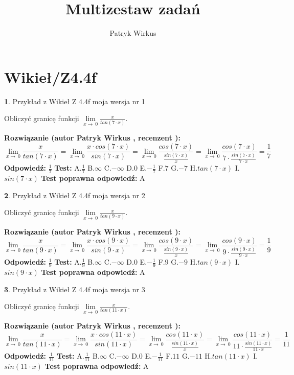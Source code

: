 \documentclass[12pt, a4paper]{article}
\title{Multizestaw zadań}
\author{Patryk Wirkus}
\date{}
\theoremstyle{definition} %
\newtheorem{zad}{}
\newcommand{\kategoria}[1]{\section{#1}}
\newcommand{\zadStart}[1]{\begin{zad}#1\newline}
\newcommand{\zadStop}{\end{zad}}
\newcommand{\rozwStart}[2]{\noindent \textbf{Rozwiązanie (autor #1 , recenzent #2): }\newline}
\newcommand{\rozwStop}{\newline}
\newcommand{\odpStart}{\noindent \textbf{Odpowiedź:}\newline}
\newcommand{\odpStop}{\newline}
\newcommand{\testStart}{\noindent \textbf{Test:}\newline}
\newcommand{\testStop}{\newline}
\newcommand{\kluczStart}{\noindent \textbf{Test poprawna odpowiedź:}\newline}
\newcommand{\kluczStop}{\newline}
\begin{document}
\maketitle

\kategoria{Wikieł/Z4.4f}


\zadStart{Przykład z Wikieł Z 4.4f moja wersja nr 1}


Obliczyć granicę funkcji $\lim\limits_{x\to\ 0}\frac{x}{tan(7 \cdot x)}$.
\zadStop
\rozwStart{Patryk Wirkus}{}
$$\lim\limits_{x\to\ 0}\frac{x}{tan(7 \cdot x)}=\lim\limits_{x\to\ 0}\frac{x \cdot cos(7 \cdot x)}{sin(7 \cdot x)}=\lim\limits_{x\to\ 0}\frac{cos(7 \cdot x)}{\frac{sin(7 \cdot x)}{x}}=\lim\limits_{x\to\ 0}\frac{cos(7 \cdot x)}{7 \cdot \frac{sin(7 \cdot x)}{7 \cdot x}} = \frac{1}{7}$$
\rozwStop
\odpStart
$\frac{1}{7}$
\odpStop
\testStart
A.$\frac{1}{7}$
B.$\infty$
C.$-\infty$
D.$0$
E.$-\frac{1}{7}$
F.$7$
G.$-7$
H.$tan(7 \cdot x)$
I.$sin(7 \cdot x)$
\testStop
\kluczStart
A
\kluczStop



\zadStart{Przykład z Wikieł Z 4.4f moja wersja nr 2}


Obliczyć granicę funkcji $\lim\limits_{x\to\ 0}\frac{x}{tan(9 \cdot x)}$.
\zadStop
\rozwStart{Patryk Wirkus}{}
$$\lim\limits_{x\to\ 0}\frac{x}{tan(9 \cdot x)}=\lim\limits_{x\to\ 0}\frac{x \cdot cos(9 \cdot x)}{sin(9 \cdot x)}=\lim\limits_{x\to\ 0}\frac{cos(9 \cdot x)}{\frac{sin(9 \cdot x)}{x}}=\lim\limits_{x\to\ 0}\frac{cos(9 \cdot x)}{9 \cdot \frac{sin(9 \cdot x)}{9 \cdot x}} = \frac{1}{9}$$
\rozwStop
\odpStart
$\frac{1}{9}$
\odpStop
\testStart
A.$\frac{1}{9}$
B.$\infty$
C.$-\infty$
D.$0$
E.$-\frac{1}{9}$
F.$9$
G.$-9$
H.$tan(9 \cdot x)$
I.$sin(9 \cdot x)$
\testStop
\kluczStart
A
\kluczStop



\zadStart{Przykład z Wikieł Z 4.4f moja wersja nr 3}


Obliczyć granicę funkcji $\lim\limits_{x\to\ 0}\frac{x}{tan(11 \cdot x)}$.
\zadStop
\rozwStart{Patryk Wirkus}{}
$$\lim\limits_{x\to\ 0}\frac{x}{tan(11 \cdot x)}=\lim\limits_{x\to\ 0}\frac{x \cdot cos(11 \cdot x)}{sin(11 \cdot x)}=\lim\limits_{x\to\ 0}\frac{cos(11 \cdot x)}{\frac{sin(11 \cdot x)}{x}}=\lim\limits_{x\to\ 0}\frac{cos(11 \cdot x)}{11 \cdot \frac{sin(11 \cdot x)}{11 \cdot x}} = \frac{1}{11}$$
\rozwStop
\odpStart
$\frac{1}{11}$
\odpStop
\testStart
A.$\frac{1}{11}$
B.$\infty$
C.$-\infty$
D.$0$
E.$-\frac{1}{11}$
F.$11$
G.$-11$
H.$tan(11 \cdot x)$
I.$sin(11 \cdot x)$
\testStop
\kluczStart
A
\kluczStop
\end{document}
